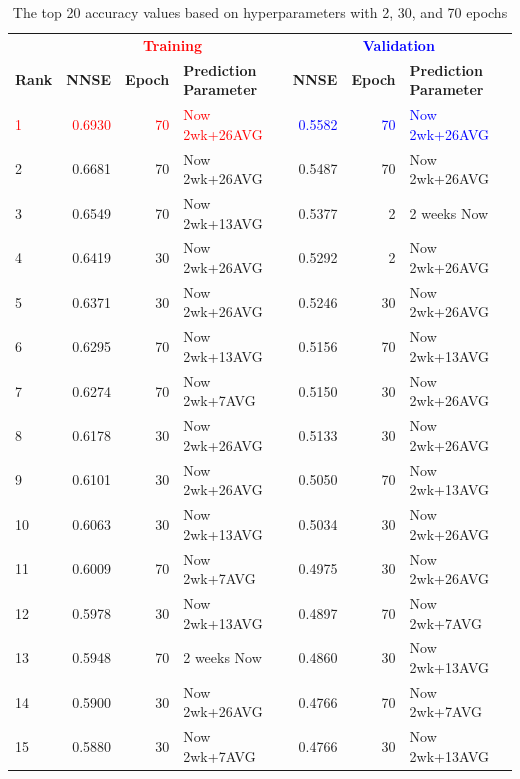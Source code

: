\documentclass[utf8]{FrontiersinVancouver} %
\begin{document}
\begin{table}[htb]
  \caption{The top 20 accuracy values based on hyperparameters with 2, 30, and 70 epochs}
  \label{tab:ranking-accuracy}
  \renewcommand{\arraystretch}{1.2}
  \begin{center}
    {\footnotesize  
\begin{tabular}{|l||r|r|l|r|r|l|}
  \hline
 &   \multicolumn{3}{c|}{\bf \textcolor{red}{Training}}  & \multicolumn{3}{c|}{\bf \textcolor{blue}{Validation}}  \\
{\bf Rank} &  {\bf NNSE} &  {\bf Epoch} & {\bf Prediction Parameter} & {\bf NNSE} &  {\bf Epoch} & {\bf Prediction Parameter}\\
\hline
\hline
\textcolor{red}{1}  &  \textcolor{red}{0.6930} &     \textcolor{red}{70} &  \textcolor{red}{Now 2wk+26AVG} &  \textcolor{blue}{0.5582} &     \textcolor{blue}{70} &  \textcolor{blue}{Now 2wk+26AVG} \\
2  &  0.6681 &     70 &  Now 2wk+26AVG &  0.5487 &     70 &  Now 2wk+26AVG \\
3  &  0.6549 &     70 &  Now 2wk+13AVG &  0.5377 &      2 &    2 weeks Now \\
4  &  0.6419 &     30 &  Now 2wk+26AVG &  0.5292 &      2 &  Now 2wk+26AVG \\
5  &  0.6371 &     30 &  Now 2wk+26AVG &  0.5246 &     30 &  Now 2wk+26AVG \\
6  &  0.6295 &     70 &  Now 2wk+13AVG &  0.5156 &     70 &  Now 2wk+13AVG \\
7  &  0.6274 &     70 &   Now 2wk+7AVG &  0.5150 &     30 &  Now 2wk+26AVG \\
8  &  0.6178 &     30 &  Now 2wk+26AVG &  0.5133 &     30 &  Now 2wk+26AVG \\
9  &  0.6101 &     30 &  Now 2wk+26AVG &  0.5050 &     70 &  Now 2wk+13AVG \\
10 &  0.6063 &     30 &  Now 2wk+13AVG &  0.5034 &     30 &  Now 2wk+26AVG \\
11 &  0.6009 &     70 &   Now 2wk+7AVG &  0.4975 &     30 &  Now 2wk+26AVG \\
12 &  0.5978 &     30 &  Now 2wk+13AVG &  0.4897 &     70 &   Now 2wk+7AVG \\
13 &  0.5948 &     70 &    2 weeks Now &  0.4860 &     30 &  Now 2wk+13AVG \\
14 &  0.5900 &     30 &  Now 2wk+26AVG &  0.4766 &     70 &   Now 2wk+7AVG \\
15 &  0.5880 &     30 &   Now 2wk+7AVG &  0.4766 &     30 &  Now 2wk+13AVG \\

\end{tabular}}
\end{center}
\end{table}
\end{document}
